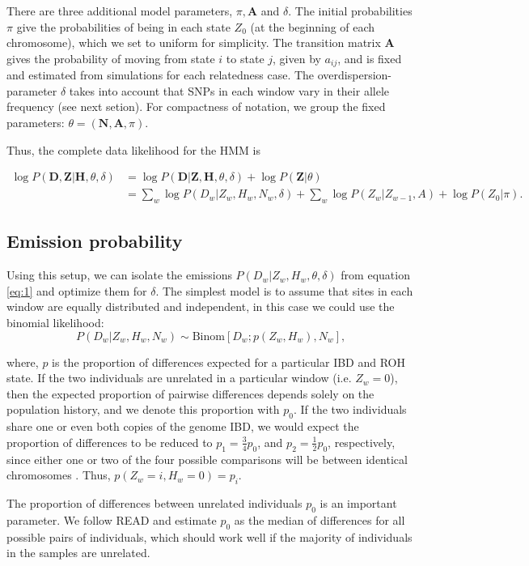 \documentclass[12pt, letterpaper]{article}
\newcommand{\BZ}{\mathbf{Z}}
\newcommand{\BD}{\mathbf{D}}
\newcommand{\BN}{\mathbf{N}}
\newcommand{\BH}{\mathbf{H}}
\begin{document}
There are three additional model parameters, $\pi, \mathbf{A}$ and $\delta$. The initial probabilities $\pi$ give the probabilities of being in each state $Z_0$ (at the beginning of each chromosome), which we set to uniform for simplicity. The transition matrix $\mathbf{A}$ gives the probability of moving from state $i$ to state $j$, given by $a_{ij}$, and is fixed and estimated from simulations for each relatedness case. The overdispersion-parameter $\delta$ takes into account that SNPs in each window vary in their allele frequency (see next setion).  For compactness of notation, we group the fixed parameters: $\theta = (\BN, \mathbf{A}, \pi)$. 

Thus, the complete data likelihood for the HMM is

\begin{align}\label{eq:1}
\log P(\BD,\BZ|\BH, \theta, \delta) &= \log P(\BD|\BZ,\BH, \theta, \delta) + \log P(\BZ |\theta) \nonumber\\
&= \sum_w \log P(D_w|Z_w,H_w, N_w, \delta) + \sum_w \log P(Z_w |Z_{w-1},A) + \log P(Z_0|\pi)\text{.}
\end{align}

\subsection{Emission probability}\label{B}

Using this setup, we can isolate the emissions $P(D_w | Z_w, H_w ,\theta, \delta)$ from equation \ref{eq:1} and optimize them for $\delta$. The simplest model is to assume that sites in each window are equally distributed and independent, in this case we could use the  binomial likelihood:
$$P(D_w|Z_w, H_w, N_w) \sim \text{Binom}[D_w ; p(Z_w, H_w), N_w] \text{,}$$

where, $p$ is the proportion of differences expected for a particular IBD and ROH state. If the two individuals are unrelated in a particular window (i.e. $Z_w = 0$), then the expected proportion of pairwise differences depends solely on the population history, and we denote this proportion with $p_0$. If the two individuals share one or even both copies of the genome IBD, we would expect the proportion of differences to be reduced to $p_1 = \frac{3}{4} p_0$, and $p_2 = \frac{1}2 p_0$, respectively, since either one or two of the four possible comparisons will be between identical chromosomes \cite{kuhn_estimating_2018}. Thus, $p(Z_w=i, H_w=0) = p_i$.

The proportion of differences between unrelated individuals $p_0$ is an important parameter. We follow READ \cite{kuhn_estimating_2018} and estimate $p_0$ as the median of differences for all possible pairs of individuals, which should work well if the majority of individuals in the samples are unrelated.
\end{document}
